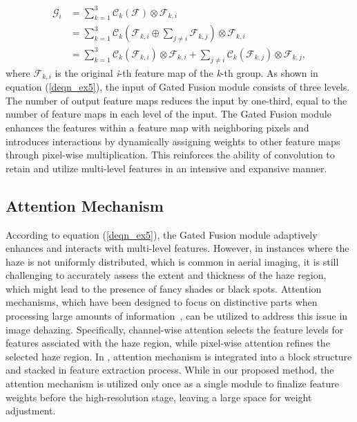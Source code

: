 \documentclass[lettersize,journal]{IEEEtran}
\begin{document}
\begin{equation}
    \label{deqn_ex5}
    \begin{aligned}
        \mathcal{G}_i &= \sum_{k=1}^3 \mathcal{C}_k(\mathcal{F}) \otimes \mathcal{F}_{k,i}\\
        &= \sum_{k=1}^3 \mathcal{C}_k(\mathcal{F}_{k,i} \oplus \sum_{j \neq i} \mathcal{F}_{k,j}) \otimes \mathcal{F}_{k,i}\\
        &= \sum_{k=1}^3 \mathcal{C}_k(\mathcal{F}_{k,i}) \otimes \mathcal{F}_{k,i} + \sum_{j \neq i} \mathcal{C}_k(\mathcal{F}_{k,j}) \otimes \mathcal{F}_{k,j},
    \end{aligned}
\end{equation}
where $\mathcal{F}_{k,i}$ is the original \textit{i}-th feature map of the \textit{k}-th group. As shown in equation (\ref{deqn_ex5}), the input of Gated Fusion module consists of three levels. The number of output feature maps reduces the input by one-third, equal to the number of feature maps in each level of the input. The Gated Fusion module enhances the features within a feature map with neighboring pixels and introduces interactions by dynamically assigning weights to other feature maps through pixel-wise multiplication. This reinforces the ability of convolution to retain and utilize multi-level features in an intensive and expansive manner.

\subsection{Attention Mechanism}
According to equation (\ref{deqn_ex5}), the Gated Fusion module adaptively enhances and interacts with multi-level features. However, in instances where the haze is not uniformly distributed, which is common in aerial imaging, it is still challenging to accurately assess the extent and thickness of the haze region, which might lead to the presence of fancy shades or black spots. Attention mechanisms, which have been designed to focus on distinctive parts when processing large amounts of information~\cite{niu2021review_on_attention}, can be utilized to address this issue in image dehazing. Specifically, channel-wise attention selects the feature levels for features assciated with the haze region, while pixel-wise attention refines the selected haze region. In \cite{qin2020ffa}, attention mechanism \cite{woo2018cbam} is integrated into a block structure and stacked in feature extraction process. While in our proposed method, the attention mechanism is utilized only once as a single module to finalize feature weights before the high-resolution stage, leaving a large space for weight adjustment.
\end{document}
